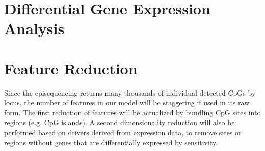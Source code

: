 \section{Differential Gene Expression Analysis}



\section{Feature Reduction}

Since the episequencing returns many thousands of individual detected CpGs by locus, the number of features in our model will be staggering if used in its raw form. The first reduction of features will be actualized by bundling CpG sites into regions (e.g. CpG islands). A second dimensionality reduction will also be performed based on drivers derived from expression data, to remove sites or regions without genes that are differentially expressed by sensitivity.
